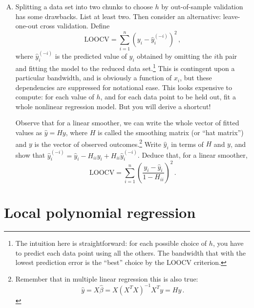 \documentclass{mynotes}
\begin{document}
\begin{enumerate}[(A)]
\item Splitting a data set into two chunks to choose $h$ by out-of-sample validation has some drawbacks.  List at least two.  Then consider an alternative: leave-one-out cross validation.  Define
$$
\mbox{LOOCV} = \sum_{i=1}^n \left( y_i - \hat{y}_{i}^{(-i)} \right)^2 \, ,
$$
where $\hat{y}_{i}^{(-i)} $ is the predicted value of $y_i$ obtained by omitting the $i$th pair and fitting the model to the reduced data set.\footnote{The intuition here is straightforward: for each possible choice of $h$, you have to predict each data point using all the others.  The bandwidth that with the lowest prediction error is the ``best'' choice by the LOOCV criterion.}  This is contingent upon a particular bandwidth, and is obviously a function of $x_i$, but these dependencies are suppressed for notational ease.  This looks expensive to compute: for each value of $h$, and for each data point to be held out, fit a whole nonlinear regression model.  But you will derive a shortcut!

Observe that for a linear smoother, we can write the whole vector of fitted values as $\hat{y} = H y$, where $H$ is called the smoothing matrix (or ``hat matrix'') and $y$ is the vector of observed outcomes.\footnote{Remember that in multiple linear regression this is also true: $$\hat{y} = X \hat{\beta} = X (X^T X)^{-1} X^T y = Hy \, .$$}  Write $\hat{y}_i$ in terms of $H$ and $y$, and show that $\hat{y}_i^{(-i)} = \hat{y}_i - H_{ii} y_i + H_{ii} \hat{y}_i^{(-i)}$.  Deduce that, for a linear smoother,
$$
\mbox{LOOCV} = \sum_{i=1}^n \left( \frac{  y_i - \hat{y}_{i} } {1-H_{ii}} \right)^2 \, .
$$


\end{enumerate}



\section{Local polynomial regression}
\end{document}
